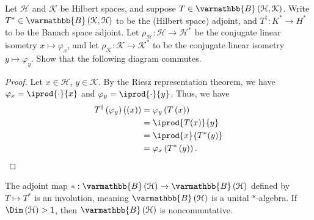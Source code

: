 \documentclass[10pt]{mypackage}
\renewcommand*{\mathbb}[1]{\varmathbb{#1}}
\newcommand{\B}{\mathbb{B}}
\begin{document}
\begin{exercise}
  Let $\mathcal{H}$ and $\mathcal{K}$ be Hilbert spaces, and suppose $T\in \B\left(\mathcal{H},\mathcal{K}\right)$. Write $T^{\ast}\in \B\left(\mathcal{K},\mathcal{H}\right)$ to be the (Hilbert space) adjoint, and $T^{\dagger}: K^{\ast}\rightarrow H^{\ast}$ to be the Banach space adjoint. Let $\rho_{\mathcal{H}}:\mathcal{H}\rightarrow \mathcal{H}^{\ast}$ be the conjugate linear isometry $x\mapsto \varphi_x$, and let $\rho_{\mathcal{K}}: \mathcal{K}\rightarrow \mathcal{K}^{\ast}$ to be the conjugate linear isometry $y \mapsto \varphi_{y}$. Show that the following diagram commutes.
  \begin{center}
  \end{center}
\end{exercise}
\begin{proof}
  Let $x\in \mathcal{H}$, $y\in \mathcal{K}$. By the Riesz representation theorem, we have $\varphi_{x} = \iprod{\cdot}{x}$ and $\varphi_{y} = \iprod{\cdot}{y}$. Thus, we have
  \begin{align*}
    T^{\dagger}\left(\varphi_y\right)\left(\left(x\right)\right) &= \varphi_{y}\left(T\left(x\right)\right)\\
                                                                 &= \iprod{T(x)}{y}\\
                                                                 &= \iprod{x}{T^{\ast}(y)}\\
                                                                 &= \varphi_{x}\left(T^{\ast}\left(y\right)\right).
  \end{align*}
  
\end{proof}
\begin{corollary}
  The adjoint map $\ast: \B\left(\mathcal{H}\right)\rightarrow \B\left(\mathcal{H}\right)$ defined by $T\mapsto T^{\ast}$ is an involution, meaning $\B\left(\mathcal{H}\right)$ is a unital $\ast$-algebra. If $\Dim\left(\mathcal{H}\right) > 1$, then $\B\left(\mathcal{H}\right)$ is noncommutative.
\end{corollary}
\end{document}
